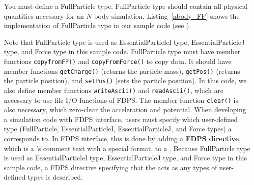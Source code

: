 You must define a \textsf{FullParticle} type. \textsf{FullParticle} type should contain all physical quantities necessary for an $N$-body simulation. Listing~\ref{nbody_FP} shows the implementation of \textsf{FullParticle} type in our sample code (see ).

\ifCpp %

\endifCpp
\ifFtn %

\endifFtn
\ifC %

\endifC

\ifCpp %
Note that \textsf{FullParticle} type is used as \textsf{EssentialParticleI} type, \textsf{EssentialParticleJ} type, and \textsf{Force} type in this sample code. \textsf{FullParticle} type must have member functions \texttt{copyfromFP()} and \texttt{copyFromForce()} to copy data. It should have member functions \texttt{getCharge()} (returns the particle mass),  \texttt{getPos()} (returns the particle position), and \texttt{setPos()} (sets the particle position). In this code, we also define member functions \texttt{writeAscii()} and \texttt{readAscii()}, which are necessary to use file I/O functions of FDPS. The member function \texttt{clear()} is also necessary, which zero-clear the acceleration and potential.
\endifCpp
\ifIF %
When developing a simulation code with FDPS \progLangName interface, users must specify which user-defined type (\textsf{FullParticle}, \textsf{EssentialParticleI}, \textsf{EssentialParticleJ}, and \textsf{Force} types) a \structure corresponds to. In FDPS \progLangName interface, this is done by adding a \textbf{FDPS directive}, which is a \progLangName's comment text with a special format, to a \structure. Because \textsf{FullParticle} type is used as \textsf{EssentialParticleI} type, \textsf{EssentialParticleJ} type, and \textsf{Force type} in this sample code, a FDPS directive specifying that the \structure acts as any types of user-defined types is described:
\endifIF
\ifFtn %
\begin{screen}
\end{screen}
\endifFtn
\ifC %
\begin{screen}
\begin{spverbatim}
typedef struct full_particle { //$fdps FP,EPI,EPJ,Force
\end{spverbatim}
\end{screen}
\endifC

